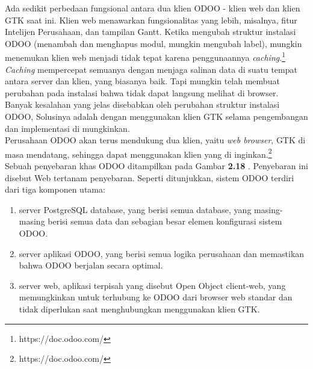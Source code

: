 Ada sedikit perbedaan fungsional antara dua klien ODOO - klien web dan klien GTK saat ini. Klien web menawarkan fungsionalitas yang lebih, misalnya, fitur Intelijen Perusahaan, dan tampilan Gantt.
Ketika  mengubah struktur instalasi ODOO (menambah dan menghapus modul, mungkin mengubah label), mungkin menemukan klien web menjadi tidak tepat karena penggunaannya \textit{caching}.\footnote{https://doc.odoo.com/}\\
\textit{Caching} mempercepat semuanya dengan menjaga salinan data di suatu tempat antara server dan klien, yang biasanya baik. Tapi mungkin telah membuat perubahan pada instalasi bahwa   tidak dapat langsung melihat di browser. Banyak kesalahan yang jelas disebabkan oleh perubahan struktur instalasi ODOO, Solusinya adalah dengan menggunakan klien GTK selama pengembangan dan implementasi di mungkinkan. \\
Perusahaan ODOO akan terus mendukung dua klien, yaitu \textit{web browser}, GTK di masa mendatang, sehingga dapat menggunakan klien yang di inginkan.\footnote{https://doc.odoo.com/} \\
Sebuah penyebaran khas ODOO ditampilkan pada Gambar \textbf{2.18} . Penyebaran ini disebut Web tertanam penyebaran. Seperti ditunjukkan, sistem ODOO terdiri dari tiga komponen utama:
\begin{enumerate}
	\item server PostgreSQL database, yang berisi semua database, yang masing-masing berisi semua data dan sebagian besar elemen konfigurasi sistem ODOO.
	\item server aplikasi ODOO, yang berisi semua logika perusahaan dan memastikan bahwa ODOO berjalan secara optimal.
	\item server web, aplikasi terpisah yang disebut Open Object client-web, yang memungkinkan   untuk terhubung ke ODOO dari browser web standar dan tidak diperlukan saat menghubungkan menggunakan klien GTK.
\end{enumerate}
